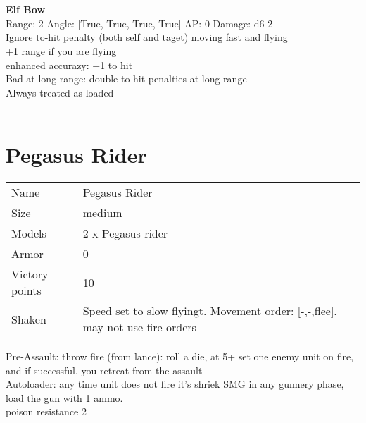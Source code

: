 \ \\

\ \\
{\bf Elf Bow } \\



Range: 2  Angle: [True, True, True, True] AP: 0 Damage: d6-2 \\
Ignore to-hit penalty (both self and taget) moving fast and flying\\ 
+1 range if you are flying\\ 
enhanced accurazy: +1 to hit\\ 
Bad at long range: double to-hit penalties at long range\\ 
Always treated as loaded\\ 




 
\ \\














\pagebreak\clearpage

\section{ Pegasus Rider }

\begin{tabular}{ll}
  Name & Pegasus Rider \\
  Size & medium\\
  Models & 2 x Pegasus rider\\
  Armor & 0\\
  Victory points & 10\\
  Shaken & Speed set to slow flyingt. Movement order: [-,-,flee]. may not use fire orders\\
\end{tabular}

Pre-Assault: throw fire (from lance): roll a die, at 5+ set one enemy unit on fire, and if successful, you retreat from the assault\\ 
Autoloader: any time unit does not fire it's shriek SMG in any gunnery phase, load the gun with 1 ammo.\\ 
poison resistance 2\\ 



